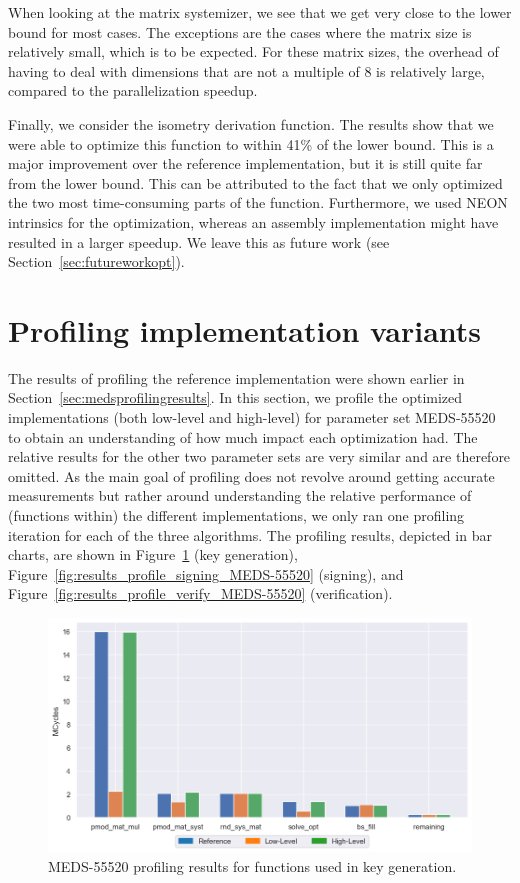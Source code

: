 \documentclass[11pt,a4paper]{report}
\theoremstyle{definition}
\begin{document}
When looking at the matrix systemizer, we see that we get very close to the lower bound for most cases. The exceptions are the cases where the matrix size is relatively small, which is to be expected. For these matrix sizes, the overhead of having to deal with dimensions that are not a multiple of 8 is relatively large, compared to the parallelization speedup.

Finally, we consider the isometry derivation function. The results show that we were able to optimize this function to within 41\% of the lower bound. This is a major improvement over the reference implementation, but it is still quite far from the lower bound. This can be attributed to the fact that we only optimized the two most time-consuming parts of the function. Furthermore, we used NEON intrinsics for the optimization, whereas an assembly implementation might have resulted in a larger speedup. We leave this as future work (see Section~\ref{sec:futureworkopt}).

\section{Profiling implementation variants}
\label{sec:profilingoptimizations}
The results of profiling the reference implementation were shown earlier in Section~\ref{sec:medsprofilingresults}. In this section, we profile the optimized implementations (both low-level and high-level) for parameter set MEDS-55520 to obtain an understanding of how much impact each optimization had. The relative results for the other two parameter sets are very similar and are therefore omitted. As the main goal of profiling does not revolve around getting accurate measurements but rather around understanding the relative performance of (functions within) the different implementations, we only ran one profiling iteration for each of the three algorithms. The profiling results, depicted in bar charts, are shown in Figure~\ref{fig:results_profile_keygen_MEDS-55520} (key generation), Figure~\ref{fig:results_profile_signing_MEDS-55520} (signing), and Figure~\ref{fig:results_profile_verify_MEDS-55520} (verification).

\begin{figure}
  \centering
  \includegraphics[width=\textwidth]{plots/barplot_MEDS-55520_profile_keygen.png}
  \caption{MEDS-55520 profiling results for functions used in key generation.}
  \label{fig:results_profile_keygen_MEDS-55520}
\end{figure}
\end{document}
